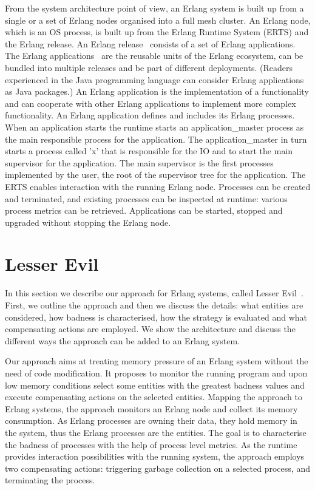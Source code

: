 \documentclass{llncs}
\begin{document}
From the system architecture point of view, an Erlang system is built up from a single or a set of Erlang nodes organised into a full mesh cluster.  An Erlang node, which is an OS process, is built up from the Erlang Runtime System (ERTS) and the Erlang release. An Erlang release~\cite{release} consists of a set of Erlang applications. The Erlang applications~\cite{application} are the reusable units of the Erlang ecosystem, can be bundled into multiple releases  and be part of different deployments. (Readers experienced in the Java programming language can consider Erlang applications as Java packages.) An Erlang application is the implementation of a functionality and can cooperate with other Erlang applications to implement more complex functionality. An Erlang application defines and includes its Erlang processes. When an application starts the runtime starts an application\_master process as the main responsible process for the application. The application\_master in turn starts a process called 'x' that is responsible for the IO and to start the main supervisor for the application. The main supervisor is the first processes implemented by the user, the root of the supervisor tree for the application. The ERTS enables interaction with the running Erlang node. Processes can be created and terminated, and existing processes can be inspected at runtime: various process metrics can be retrieved. Applications can be started, stopped and upgraded without stopping the Erlang node.


\section{Lesser Evil}
In this section we describe our approach  for Erlang systems, called Lesser Evil~\cite{lesser-evil}.
First, we outline the approach and then we discuss the details: what entities are considered, how badness is characterised, how the strategy is evaluated and what compensating actions are employed. We show the architecture and discuss the different ways the approach can be added to an Erlang system.

Our approach aims at treating memory pressure of an Erlang system without the need of code modification. It proposes to monitor the running program and upon low memory conditions select some entities with the greatest  badness values and execute compensating actions on the selected entities. Mapping the approach to Erlang systems, the approach monitors an Erlang node and collect its memory consumption. As Erlang processes are owning their data, they hold memory in the system, thus the Erlang processes are the entities. The goal is to characterise the badness of processes with the help of process level metrics. As the runtime provides interaction possibilities with the running system, the approach employs two compensating actions: triggering garbage collection on a selected process, and terminating the process.
\end{document}
